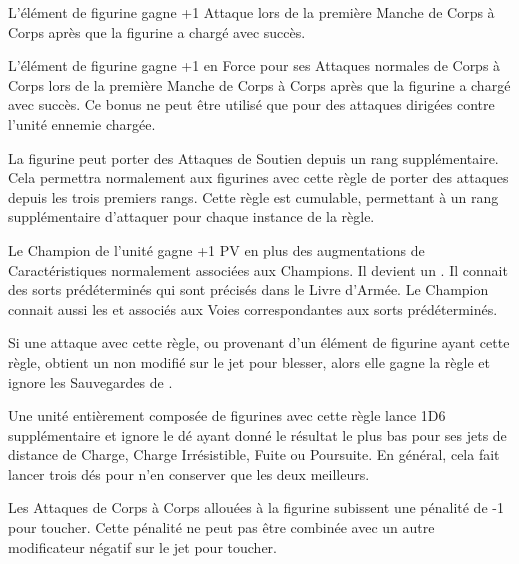 
L'élément de figurine gagne +1 Attaque lors de la première Manche de Corps à Corps après que la figurine a chargé avec succès.


L'élément de figurine gagne +1 en Force pour ses Attaques normales de Corps à Corps lors de la première Manche de Corps à Corps après que la figurine a chargé avec succès. Ce bonus ne peut être utilisé que pour des attaques dirigées contre l'unité ennemie chargée.


La figurine peut porter des Attaques de Soutien depuis un rang supplémentaire. Cela permettra normalement aux figurines avec cette règle de porter des attaques depuis les trois premiers rangs. Cette règle est cumulable, permettant à un rang supplémentaire d'attaquer pour chaque instance de la règle.


Le Champion de l'unité gagne +1 PV en plus des augmentations de Caractéristiques normalement associées aux Champions. Il devient un \wizardapprentice{}. Il connait des sorts prédéterminés qui sont précisés dans le Livre d'Armée. Le Champion connait aussi les \traitspells{} et \attributespells{} associés aux Voies correspondantes aux sorts prédéterminés.


Si une attaque avec cette règle, ou provenant d'un élément de figurine ayant cette règle, obtient un  non modifié sur le jet pour blesser, alors elle gagne la règle  et ignore les Sauvegardes de \regeneration{}.


Une unité entièrement composée de figurines avec cette règle lance 1D6 supplémentaire et ignore le dé ayant donné le résultat le plus bas pour ses jets de distance de Charge, Charge Irrésistible, Fuite ou Poursuite. En général, cela fait lancer trois dés pour n'en conserver que les deux meilleurs.


Les Attaques de Corps à Corps allouées à la figurine subissent une pénalité de -1 pour toucher. Cette pénalité ne peut pas être combinée avec un autre modificateur négatif sur le jet pour toucher.

